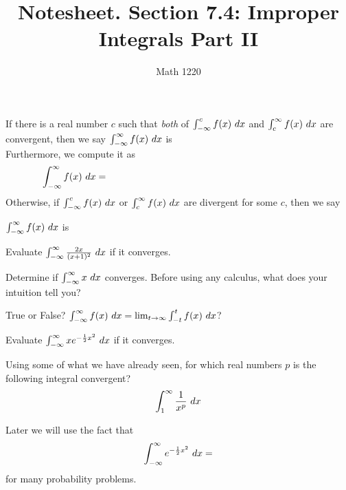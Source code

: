 \documentclass[12pt, a4paper]{article}
\author{Math 1220}
\title{Notesheet. Section 7.4: Improper Integrals Part II}
\date{}
\begin{document}
\maketitle
\nameline
\begin{defi}
  If there is a real number \(c\) such that \emph{both} of
  \(\int_{-\infty}^c f(x) \ d x\) and \(\int_c^{\infty} f(x) \ d x\) are
  convergent, then we say \(\int_{-\infty}^\infty f(x) \ d x\) is \\

  Furthermore, we compute it as \[
    \int_{-\infty}^\infty f(x) \dx = \hspace{3in}
  \]
  Otherwise, if \(\int_{-\infty}^c f(x)\ d x\) or \(\int_c^\infty f(x)
  \ d x\) are divergent for some \(c\), then we say
  
  \(\int_{-\infty}^\infty f(x) \ d x\) is
\end{defi}
\begin{ex}
  Evaluate \(\int_{-\infty}^\infty \frac{2x}{(x+1)^2} \ d x\) if it converges.
\end{ex}
\begin{ex}
  Determine if \(\int_{-\infty}^\infty x \ d x\) converges. Before using
  any calculus, what does your intuition tell you?
\end{ex}
\begin{ex}
  True or False? \(\int_{-\infty}^\infty f(x) \ d x = \lim_{t \to
    \infty} \int_{-t}^t f(x)\ d x\)?
\end{ex}
\begin{ex}
  Evaluate \(\int_{-\infty}^\infty x e^{-\frac{1}{2}x^2} \ d x\) if it
  converges. 
\end{ex}
\begin{ex}
  Using some of what we have already seen, for which real numbers
  \(p\) is the following integral convergent? \[
    \int_1^\infty \frac{1}{x^p} \ d x
  \]
\end{ex}
\begin{rmk}
  Later we will use the fact that \[
    \int_{-\infty}^\infty e^{-\frac{1}{2}x^2} \ d x = 
  \]
  for many probability problems.
\end{rmk}
\end{document}
